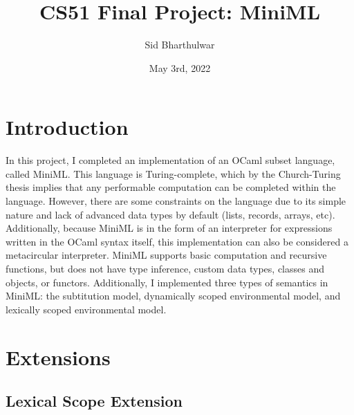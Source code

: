\documentclass{article}
\title{CS51 Final Project: MiniML}
\author{Sid Bharthulwar}
\date{May 3rd, 2022}
\begin{document}
\maketitle

\section{Introduction}

In this project, I completed an implementation of an OCaml subset language, called MiniML. This language is Turing-complete, which by the Church-Turing thesis implies that any performable computation can be completed within the language. However, there are some constraints on the language due to its simple nature and lack of advanced data types by default (lists, records, arrays, etc). Additionally, because MiniML is in the form of an interpreter for expressions written in the OCaml syntax itself, this implementation can also be considered a metacircular interpreter.  MiniML supports basic computation and recursive functions, but does not have type inference, custom data types, classes and objects, or functors. Additionally, I implemented three types of semantics in MiniML: the subtitution model, dynamically scoped environmental model, and lexically scoped environmental model. 

\section{Extensions}

\subsection{Lexical Scope Extension}
\end{document}
